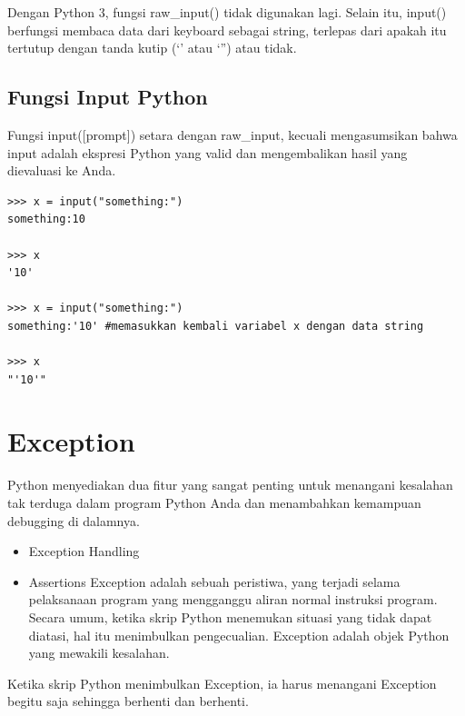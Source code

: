 Dengan Python 3, fungsi raw\_input() tidak digunakan lagi. Selain itu, input() berfungsi membaca data dari keyboard sebagai string, terlepas dari apakah itu tertutup dengan tanda kutip (‘’ atau ‘”) atau tidak.

\subsection{Fungsi Input Python}
Fungsi input([prompt]) setara dengan raw\_input, kecuali mengasumsikan bahwa input adalah ekspresi Python yang valid dan mengembalikan hasil yang dievaluasi ke Anda.

\begin{lstlisting}
>>> x = input("something:")
something:10

>>> x
'10'

>>> x = input("something:")
something:'10' #memasukkan kembali variabel x dengan data string

>>> x
"'10'"
\end{lstlisting}

\section{Exception}
Python menyediakan dua fitur yang sangat penting untuk menangani kesalahan tak terduga dalam program Python Anda dan menambahkan kemampuan debugging di dalamnya.

\begin{itemize}
\item Exception Handling
\item Assertions Exception adalah sebuah peristiwa, yang terjadi selama pelaksanaan program yang mengganggu aliran normal instruksi program. Secara umum, ketika skrip Python menemukan situasi yang tidak dapat diatasi, hal itu menimbulkan pengecualian. Exception adalah objek Python yang mewakili kesalahan.
\end{itemize}

Ketika skrip Python menimbulkan Exception, ia harus menangani Exception begitu saja sehingga berhenti dan berhenti.

